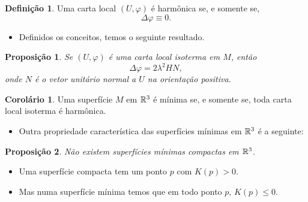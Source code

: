 \documentclass[10pt,a4paper]{beamer}
\newtheorem{proposicao}{Proposição}
\theoremstyle{definition}
\newtheorem{definicao}{Definição}
\newtheorem{corolario}{Corolário}
\begin{document}
\begin{frame}

	\begin{definicao}
		Uma carta local $(U,\varphi)$ é \alert{harmônica} se, e somente se,
		\begin{equation*}
		\Delta \varphi \equiv 0.
		\end{equation*}
	\end{definicao}

	\pause
	
	\begin{itemize}
		\item Definidos os conceitos, temos o seguinte resultado.
	\end{itemize}

	\pause
	
	\begin{proposicao}
		Se $(U, \varphi)$ é uma carta local isoterma em $M$, então 
		\begin{equation*}
		\Delta \varphi = 2 \lambda^2 H N,
		\end{equation*}
		onde $N$ é o vetor unitário normal a $U$ na orientação positiva.
	\end{proposicao}
	
\end{frame}

\begin{frame}
	
	\begin{corolario}
		Uma superfície $M$ em $\mathbb R^3$ é \alert{mínima} se, e somente se, \alert{toda carta local isoterma é harmônica}.
	\end{corolario}

	\pause

	\begin{itemize}
		\item Outra propriedade característica das superfícies mínimas em $\mathbb R^3$ é a seguinte:
	\end{itemize}

	\pause

	\begin{proposicao}
		\alert{Não existem} superfícies mínimas compactas em $\mathbb R^3$.
	\end{proposicao}
	
	\pause
	
	\begin{itemize}
		\item Uma superfície compacta tem um ponto $p$ com $K(p) > 0$.
		
		\pause
		
		\item Mas numa superfície mínima temos que em todo ponto $p$, $K(p) \leq 0$.
	\end{itemize}
	
\end{frame}
\end{document}
